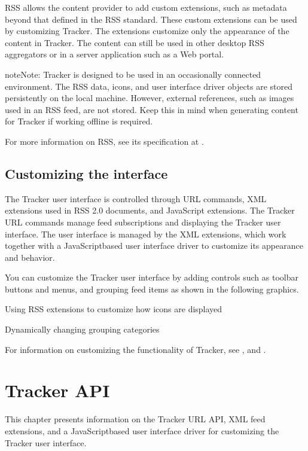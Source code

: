 \documentclass[letterpaper,12pt,english,openany,oneside]{sphinxmanual}
\begin{document}
RSS allows the content provider to add custom extensions, such as metadata beyond that defined in the RSS standard. These custom extensions can be used by customizing Tracker. The extensions customize only the appearance of the content in Tracker. The content can still be used in other desktop RSS aggregators or in a server application such as a Web portal.

\begin{sphinxadmonition}{note}{Note:}
Tracker is designed to be used in an occasionally connected environment. The RSS data, icons, and user interface driver objects are stored persistently on the local machine. However, external references, such as images used in an RSS feed, are not stored. Keep this in mind when generating content for Tracker if working offline is required.
\end{sphinxadmonition}

For more information on RSS, see its specification at  .


\section{Customizing the interface}
\label{\detokenize{index:customizing-the-interface}}
The Tracker user interface is controlled through URL commands, XML extensions used in RSS 2.0 documents, and JavaScript extensions. The Tracker URL commands manage feed subscriptions and displaying the Tracker user interface. The user interface is managed by the XML extensions, which work together with a JavaScript\sphinxhyphen{}based user interface driver to customize its appearance and behavior.

You can customize the Tracker user interface by adding controls such as toolbar buttons and menus, and grouping feed items as shown in the following graphics.

Using RSS extensions to customize how icons are displayed

\noindent{}

Dynamically changing grouping categories

\noindent{}

For information on customizing the functionality of Tracker, see , and .


\chapter{Tracker API}
\label{\detokenize{Tracker_InboxAPI:tracker-api}}\label{\detokenize{Tracker_InboxAPI::doc}}
This chapter presents information on the Tracker URL API, XML feed extensions, and a JavaScript\sphinxhyphen{}based user interface driver for customizing the Tracker user interface.
\end{document}

